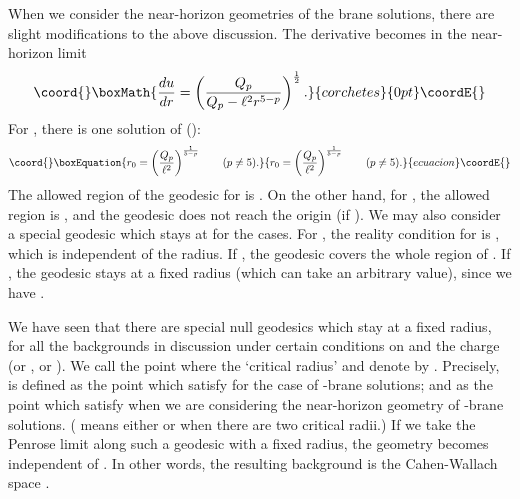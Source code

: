 \documentclass[a4paper,12pt]{article}
\begin{document}
When we consider the near-horizon geometries of
the brane solutions, there are slight modifications
to the above discussion.
The derivative \coordHE{} becomes in the near-horizon
limit 
\[\coord{}\boxMath{
 {du\over dr}=\left(Q_{p}\over Q_{p}-\ell^2 r^{5-p}\right)^{1\over2}.
}{corchetes}{0pt}\coordE{}\]
For \coordHE{}, there is one solution of
\coordHE{} (\coordHE{}):
\begin{equation}\coord{}\boxEquation{
r_0=\left({Q_{p}\over\ell^2}\right)^{1\over 5-p} \qquad (p\ne 5).
\label{eq:nhr0}
}{
r_0=\left({Q_{p}\over\ell^2}\right)^{1\over 5-p} \qquad (p\ne 5).
}{ecuacion}\coordE{}\end{equation}
The allowed region of the geodesic for \coordHE{}
is \coordHE{}. 
On the other hand, for \coordHE{}, the allowed region
is \coordHE{}, and the geodesic does not reach the origin
(if \coordHE{}). 
We may also consider a special geodesic which stays
at \coordHE{} for the \coordHE{} cases.
For \coordHE{}, the reality condition for \coordHE{} 
is \coordHE{}, which is independent of the radius.
If \coordHE{}, the geodesic covers the whole 
region of \coordHE{}. If \coordHE{}, the geodesic
stays at a fixed radius (which can take an arbitrary 
value), since we have \coordHE{}. 


We have seen that there are special null geodesics which stay
at a fixed radius, for all the backgrounds in discussion
under certain conditions on \myHighlight{$\ell$}\coordHE{} and the charge \coordHE{}
(or \coordHE{}, or \coordHE{}). 
We call the point where \coordHE{} 
the `critical radius' and denote by \coordHE{}. 
Precisely, \coordHE{} is defined as
the point which satisfy
\coordHE{}
for the case of \coordHE{}-brane solutions; 
and as the point which satisfy
\coordHE{} when we are considering
the near-horizon geometry of \coordHE{}-brane solutions.
(\coordHE{} means either \coordHE{} or \coordHE{} when 
there are two critical radii.)
If we take the Penrose limit along such a 
geodesic with a fixed radius,
the geometry becomes independent of \coordHE{}.
In other words, the resulting background
is the Cahen-Wallach space \cite{CaWa}.
\end{document}
